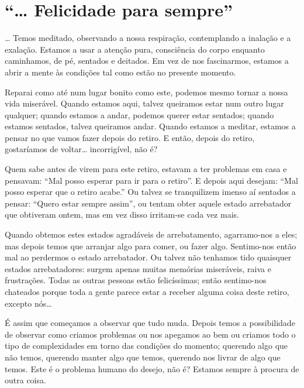 \chapter{``\ldots{} Felicidade para sempre''}

\ldots{} Temos meditado, observando a nossa respiração, contemplando a inalação
e a exalação. Estamos a usar a atenção pura, consciência do corpo enquanto
caminhamos, de pé, sentados e deitados. Em vez de nos fascinarmos, estamos a
abrir a mente às condições tal como estão no presente momento.

Reparai como até num lugar bonito como este, podemos mesmo tornar a nossa vida
miserável. Quando estamos aqui, talvez queiramos estar num outro lugar qualquer;
quando estamos a andar, podemos querer estar sentados; quando estamos sentados,
talvez queiramos andar. Quando estamos a meditar, estamos a pensar no que vamos
fazer depois do retiro. E então, depois do retiro, gostaríamos de voltar\ldots{}
incorrigível, não é?

Quem sabe antes de virem para este retiro, estavam a ter problemas em casa e
pensavam: ``Mal posso esperar para ir para o retiro''. E depois aqui desejam:
``Mal posso esperar que o retiro acabe.'' Ou talvez se tranquilizem imenso aí
sentados a pensar: ``Quero estar sempre assim'', ou tentam obter aquele estado
arrebatador que obtiveram ontem, mas em vez disso irritam-se cada vez mais.

Quando obtemos estes estados agradáveis de arrebatamento, agarramo-nos a eles;
mas depois temos que arranjar algo para comer, ou fazer algo. Sentimo-nos então
mal ao perdermos o estado arrebatador. Ou talvez não tenhamos tido quaisquer
estados arrebatadores: surgem apenas muitas memórias miseráveis, raiva e
frustrações. Todas as outras pessoas estão felicíssimas; então sentimo-nos
chateados porque toda a gente parece estar a receber alguma coisa deste retiro,
excepto nós\ldots{}

É assim que começamos a observar que tudo muda. Depois temos a possibilidade de
observar como criamos problemas ou nos apegamos ao bem ou criamos todo o tipo de
complexidades em torno das condições do momento; querendo algo que não temos,
querendo manter algo que temos, querendo nos livrar de algo que temos. Este é o
problema humano do desejo, não é? Estamos sempre à procura de outra coisa.

